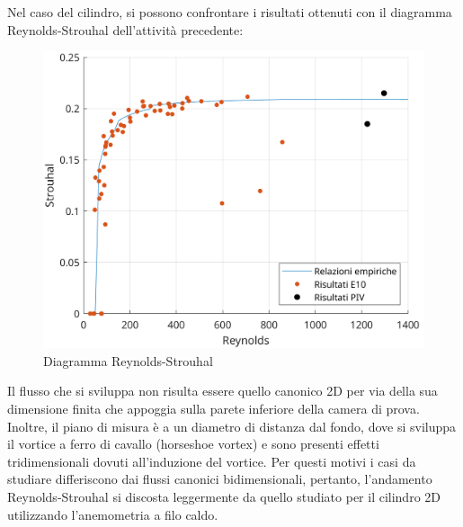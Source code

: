 \noindent Nel caso del cilindro, si possono confrontare i risultati ottenuti con il diagramma Reynolds-Strouhal dell'attività precedente:
\begin{figure}[H]
    \centering
    \includegraphics[width=.75\textwidth]{images/11/Re-St.png}
    \caption{Diagramma Reynolds-Strouhal}
\end{figure}

\noindent Il flusso che si sviluppa non risulta essere quello canonico 2D per via della sua dimensione finita che appoggia sulla parete inferiore della camera di prova. Inoltre, il piano di misura è a un diametro di distanza dal fondo, dove si sviluppa il vortice a ferro di cavallo (horseshoe vortex) e sono presenti effetti tridimensionali dovuti all'induzione del vortice. Per questi motivi i casi da studiare differiscono dai flussi canonici bidimensionali, pertanto, l'andamento Reynolds-Strouhal si discosta leggermente da quello studiato per il cilindro 2D utilizzando l'anemometria a filo caldo.

